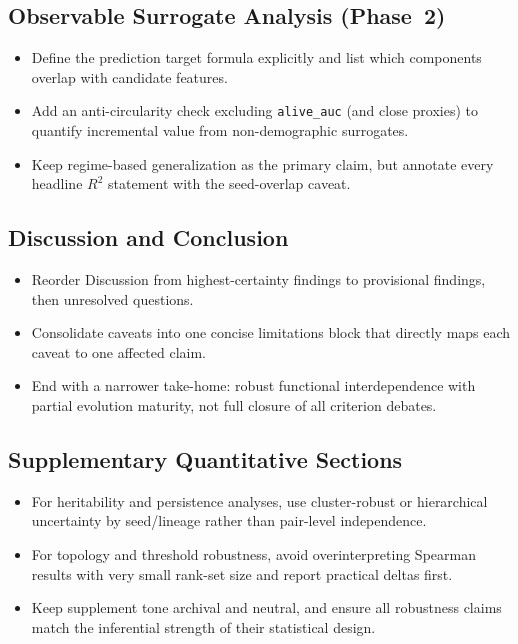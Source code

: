 \documentclass[11pt]{article}
\begin{document}
\subsection*{Observable Surrogate Analysis (Phase~2)}
\begin{itemize}
  \item Define the prediction target formula explicitly and list which components overlap with candidate features.
  \item Add an anti-circularity check excluding \texttt{alive\_auc} (and close proxies) to quantify incremental value from non-demographic surrogates.
  \item Keep regime-based generalization as the primary claim, but annotate every headline $R^2$ statement with the seed-overlap caveat.
\end{itemize}

\subsection*{Discussion and Conclusion}
\begin{itemize}
  \item Reorder Discussion from highest-certainty findings to provisional findings, then unresolved questions.
  \item Consolidate caveats into one concise limitations block that directly maps each caveat to one affected claim.
  \item End with a narrower take-home: robust functional interdependence with partial evolution maturity, not full closure of all criterion debates.
\end{itemize}

\subsection*{Supplementary Quantitative Sections}
\begin{itemize}
  \item For heritability and persistence analyses, use cluster-robust or hierarchical uncertainty by seed/lineage rather than pair-level independence.
  \item For topology and threshold robustness, avoid overinterpreting Spearman results with very small rank-set size and report practical deltas first.
  \item Keep supplement tone archival and neutral, and ensure all robustness claims match the inferential strength of their statistical design.
\end{itemize}
\end{document}
